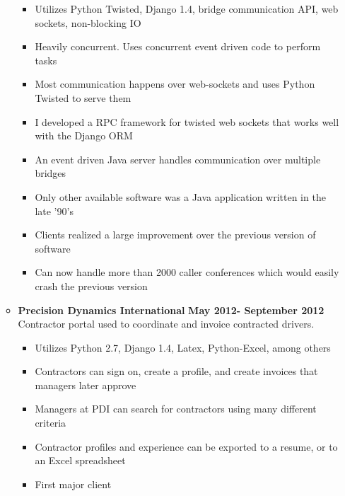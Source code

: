 \documentclass[overlapped]{res}
\begin{document}
\begin{resume}
\begin{itemize}[leftmargin=0in]
\begin{itemize}[leftmargin=0in]
\begin{samepage}
\begin{itemize}
                        \item[\textbullet] Utilizes Python Twisted, Django 1.4, bridge communication API, web sockets, non-blocking IO
                        \item[\textbullet] Heavily concurrent. Uses concurrent event driven code to perform tasks
                        \item[\textbullet] Most communication happens over web-sockets and uses Python Twisted to serve them
                        \item[\textbullet] I developed a RPC framework for twisted web sockets that works well with the Django ORM
                        \item[\textbullet] An event driven Java server handles communication over multiple bridges
                        \item[\textbullet] Only other available software was a Java application written in the late '90's
                        \item[\textbullet] Clients realized a large improvement over the previous version of software
                        \item[\textbullet] Can now handle more than 2000 caller conferences which would easily crash the previous version
                    \end{itemize}
                \end{samepage}
            \item[]
                \begin{samepage}
                    \textbf{Precision Dynamics International} \hfill \textbf{May 2012- September 2012} \\
                    Contractor portal used to coordinate and invoice contracted drivers.
                    \begin{itemize}
                        \item[\textbullet] Utilizes Python 2.7, Django 1.4, Latex, Python-Excel, among others
                        \item[\textbullet] Contractors can sign on, create a profile, and create invoices that managers later approve
                        \item[\textbullet] Managers at PDI can search for contractors using many different criteria
                        \item[\textbullet] Contractor profiles and experience can be exported to a resume, or to an Excel spreadsheet
                        \item[\textbullet] First major client
                    \end{itemize}
                \end{samepage}
        \end{itemize}
\end{itemize}
\vspace{0.25in}


\end{resume}
\end{document}
